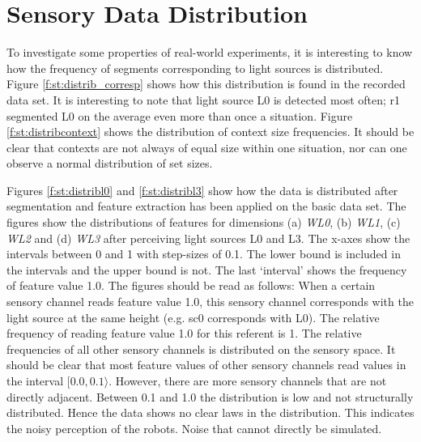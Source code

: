 \chapter{Sensory Data Distribution}\label{a:dataset}

To investigate some properties of real-world experiments, it is interesting to know how the frequency of segments corresponding to light sources is distributed. Figure \ref{f:st:distrib_corresp} shows how this distribution is found in the recorded data set. It is interesting to note that light source L0 is detected most often; r1 segmented L0 on the average even more than once a situation. Figure \ref{f:st:distribcontext} shows the distribution of context size frequencies. It should be clear that contexts are not always of equal size within one situation, nor can one observe a normal distribution of set sizes.

Figures \ref{f:st:distribl0} and \ref{f:st:distribl3} show how the data is distributed after segmentation and feature extraction has been applied on the basic data set. The figures show the distributions of features for dimensions (a) {\em WL0}, (b) {\em WL1}, (c) {\em WL2} and (d) {\em WL3} after perceiving light sources L0 and L3. The x-axes show the intervals between 0 and 1 with step-sizes of 0.1. The lower bound is included in the intervals and the upper bound is not. The last `interval' shows the frequency of feature value 1.0. The figures should be read as follows: When a certain sensory channel reads feature value 1.0, this sensory channel corresponds with the light source at the same height (e.g. sc0 corresponds with L0). The relative frequency of reading feature value 1.0 for this referent is 1. The relative frequencies of all other sensory channels is distributed on the sensory space. It should be clear that most feature values of other sensory channels read values in the interval $[0.0,0.1\rangle$. 
However, there are more sensory channels that are not directly adjacent. Between 0.1 and 1.0 the distribution is low and not structurally distributed. Hence the data shows no clear laws in the distribution. This indicates the noisy perception of the robots. Noise that cannot directly be simulated.


